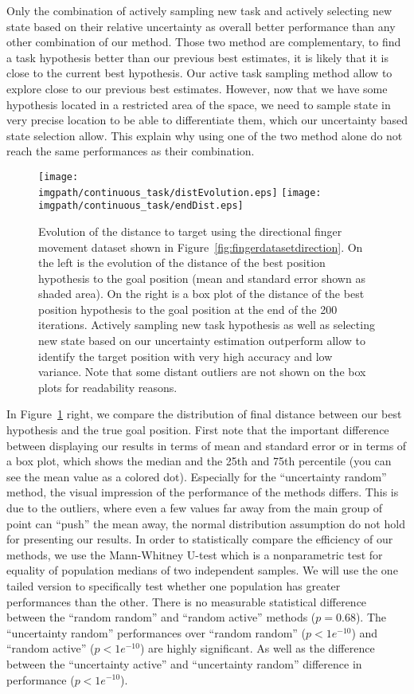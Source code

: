 Only the combination of actively sampling new task and actively selecting new state based on their relative uncertainty as overall better performance than any other combination of our method. Those two method are complementary, to find a task hypothesis better than our previous best estimates, it is likely that it is close to the current best hypothesis. Our active task sampling method allow to explore close to our previous best estimates. However, now that we have some hypothesis located in a restricted area of the space, we need to sample state in very precise location to be able to differentiate them, which our uncertainty based state selection allow. This explain why using one of the two method alone do not reach the same performances as their combination.

\begin{figure}[!ht]
\centering
\texttt{[image: \\imgpath/continuous\_task/distEvolution.eps]}
\texttt{[image: \\imgpath/continuous\_task/endDist.eps]}
\caption{Evolution of the distance to target using the directional finger movement dataset shown in Figure~\ref{fig:fingerdatasetdirection}. On the left is the evolution of the distance of the best position hypothesis to the goal position (mean and standard error shown as shaded area). On the right is a box plot of the distance of the best position hypothesis to the goal position at the end of the 200 iterations. Actively sampling new task hypothesis as well as selecting new state based on our uncertainty estimation outperform allow to identify the target position with very high accuracy and low variance. Note that some distant outliers are not shown on the box plots for readability reasons.}
\label{fig:continuoustaskdistevolution}
\end{figure}

In Figure~\ref{fig:continuoustaskdistevolution} right, we compare the distribution of final distance between our best hypothesis and the true goal position. First note that the important difference between displaying our results in terms of mean and standard error or in terms of a box plot, which shows the median and the 25th and 75th percentile (you can see the mean value as a colored dot). Especially for the ``uncertainty random'' method, the visual impression of the performance of the methods differs. This is due to the outliers, where even a few values far away from the main group of point can ``push'' the mean away, the normal distribution assumption do not hold for presenting our results. In order to statistically compare the efficiency of our methods, we use the Mann-Whitney U-test \cite{mann1947test} which is a nonparametric test for equality of population medians of two independent samples. We will use the one tailed version to specifically test whether one population has greater performances than the other. There is no measurable statistical difference between the ``random random'' and ``random active'' methods ($p = 0.68$). The ``uncertainty random'' performances over ``random random'' ($p<1e^{-10}$) and ``random active'' ($p<1e^{-10}$) are highly significant. As well as the difference between the ``uncertainty active'' and ``uncertainty random'' difference in performance ($p<1e^{-10}$).

